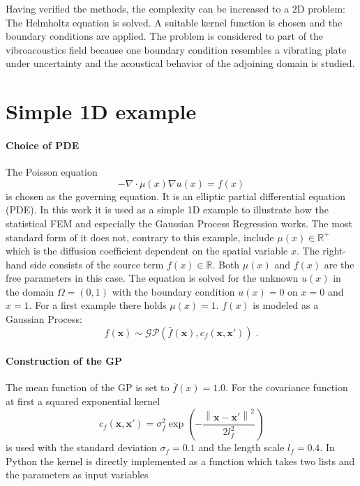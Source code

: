 \documentclass[%
  a4paper,oneside,%
  11pt,%
  smallchapters,
  style=printdev,
  extramargin,
  green,%
  rgb, <cmyk>
  ]{tubsbook}
\begin{document}
Having verified the methods, the complexity can be increased to a 2D problem: The Helmholtz equation is solved. A suitable kernel function is chosen and the boundary conditions are applied. The problem is considered to part of the vibroacoustics field because one boundary condition resembles a vibrating plate under uncertainty and the acoustical behavior of the adjoining domain is studied.

\section{Simple 1D example}
\paragraph{Choice of PDE}
The Poisson equation 
\begin{equation}
- \nabla \cdot \mu(x) \nabla u(x) = f(x)
\label{eqn:Poisson}
\end{equation}
is chosen as the governing equation. It is an elliptic partial differential equation (PDE). In this work it is used as a simple 1D example to illustrate how the statistical FEM and especially the Gaussian Process Regression works.
The most standard form of it does not, contrary to this example, include $\mu(x) \in \mathbb{R}^+$ which is the diffusion coefficient dependent on the spatial variable $x$. The right-hand side consists of the source term $f(x)\in \mathbb{R}$. Both $\mu (x)$ and $f(x)$ are the free parameters in this case. The equation is solved for the unknown  $u(x)$ in the domain $\Omega = (0,1)$ with the boundary condition $u(x) = 0$ on $x=0$ and $x=1$.
%
For a first example there holds $\mu(x)=1$. $f(x)$ is modeled as a Gaussian Process: \cite{girolami2021}
%
\begin{equation}
f(\bm{x}) \sim \mathcal{GP} \left( \bar{f}(\bm{x}), c_f(\bm{x},\bm{x}')\right) \;.
\end{equation}
%
\paragraph{Construction of the GP}
The mean function of the GP is set to $\bar{f}(x) = 1.0$. For the covariance function at first a squared exponential kernel 
%
\begin{equation}
c_f(\bm{x},\bm{x}') =    \sigma_{f}^2 \exp \left(-  \frac{\left \| \bm{x}-{\bm{x}}' \right \|^2}{2l_{f}^2} \right )       
\label{eqn:sqEx_f}
\end{equation}
%
is used with the standard deviation $\sigma_{f} = 0.1$ and the length scale $l_{f} = 0.4$.
In Python the kernel is directly implemented as a function which takes two lists and the parameters as input variables \cite{murphy2012}
\end{document}
